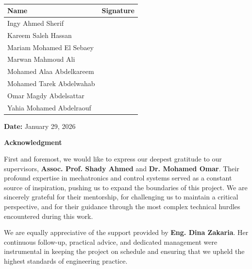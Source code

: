 \documentclass[11pt,a4paper,twoside]{report}
\begin{document}
\begin{table}[H]
\centering
\renewcommand{\arraystretch}{2.5}  %
\begin{tabularx}{\textwidth}{|>{\centering\arraybackslash}X|>{\centering\arraybackslash}X|}  
\hline
\textbf{Name} & \textbf{Signature} \\ \hline
Ingy Ahmed Sherif &  \\ \hline
Kareem Saleh Hassan &  \\ \hline
Mariam Mohamed El Sebaey &  \\ \hline
Marwan Mahmoud Ali &  \\ \hline
Mohamed Alaa Abdelkareem &  \\ \hline
Mohamed Tarek Abdelwahab &  \\ \hline
Omar Magdy Abdelsattar &  \\ \hline
Yahia Mohamed Abdelraouf &  \\ \hline
\end{tabularx}
\caption*{} %
\label{tab:signatures}
\end{table}

\textbf{Date:}
January 29, 2026
\clearpage

\vspace*{-2cm} %
\thispagestyle{footeronly}
\begin{center}
    {\Large \textbf{Acknowledgment}} %
\end{center}

\vspace{1cm} %

First and foremost, we would like to express our deepest gratitude to our supervisors, \textbf{Assoc. Prof. Shady Ahmed} and \textbf{Dr. Mohamed Omar}. Their profound expertise in mechatronics and control systems served as a constant source of inspiration, pushing us to expand the boundaries of this project. We are sincerely grateful for their mentorship, for challenging us to maintain a critical perspective, and for their guidance through the most complex technical hurdles encountered during this work.

We are equally appreciative of the support provided by \textbf{Eng. Dina Zakaria}. Her continuous follow-up, practical advice, and dedicated management were instrumental in keeping the project on schedule and ensuring that we upheld the highest standards of engineering practice.
\end{document}
